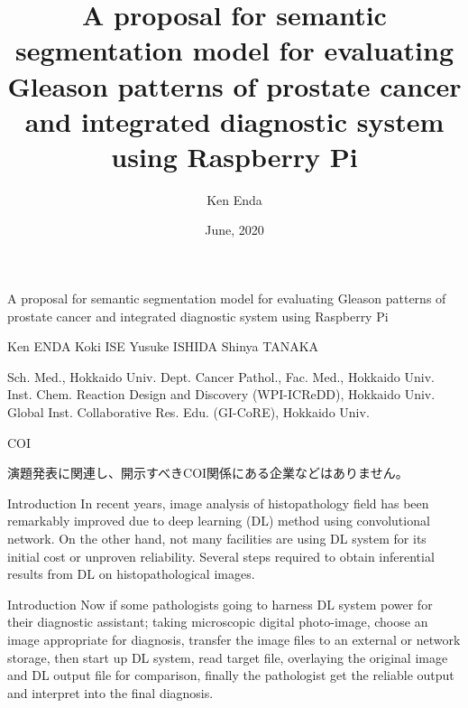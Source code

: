 \documentclass[
  dvipdfmx,
  xcolor={svgnames},
  hyperref={colorlinks,citecolor=DeepPink4,linkcolor=DarkRed,urlcolor=DarkBlue}
  ]{beamer}
\title{}
\title[A proposal of semantic segmentation model for Gleason patterns and integrated diagnostic system using Raspberry Pi]{A proposal for semantic segmentation model for evaluating Gleason patterns of prostate cancer and integrated diagnostic system using Raspberry Pi}
\author{Ken Enda}
\institute{Department of Cancer Pathology Faculty of Medicine, HOKKAIDO UNIVERSITY}
\date[]{June, 2020}
\begin{document}
\nocite{*}

\begin{frame}{}
  \huge A proposal for semantic segmentation model for evaluating Gleason patterns of prostate cancer and integrated diagnostic system using Raspberry Pi\par
  \vspace{0.5zh}
  \small Ken ENDA \cite{student} Koki ISE\cite{student} Yusuke ISHIDA\cite{dept} Shinya TANAKA\cite{dept}\cite{icredd}\cite{gicore}
  \begin{thebibliography}{99}
    \beamertemplatetextbibitems
    \setlength{\itemsep}{-.5zw}
     Sch. Med., Hokkaido Univ.
     Dept. Cancer Pathol., Fac. Med., Hokkaido Univ.
     Inst. Chem. Reaction Design and Discovery (WPI-ICReDD), Hokkaido Univ.  
     Global Inst. Collaborative Res. Edu. (GI-CoRE), Hokkaido Univ.
  \end{thebibliography}
\end{frame}

\begin{frame}{COI}
  \begin{center}
    \setlength{\fboxsep}{1em}
    \par
    \vspace{1zh}
    演題発表に関連し、開示すべきCOI関係にある企業などはありません。
  \end{center}
\end{frame}

\begin{frame}{Introduction}
  In recent years, image analysis of histopathology field has been remarkably improved due to deep learning (DL) method using convolutional network. On the other hand, not many facilities are using DL system for its initial cost or unproven reliability. Several steps required to obtain inferential results from DL on histopathological images.
\end{frame}

\begin{frame}{Introduction}
  Now if some pathologists going to harness DL system power for their diagnostic assistant; taking microscopic digital photo-image, choose an image appropriate for diagnosis, transfer the image files to an external or network storage, then start up DL system, read target file, overlaying the original image and DL output file for comparison, finally the pathologist get the reliable output and interpret into the final diagnosis.
\end{frame}
\end{document}
